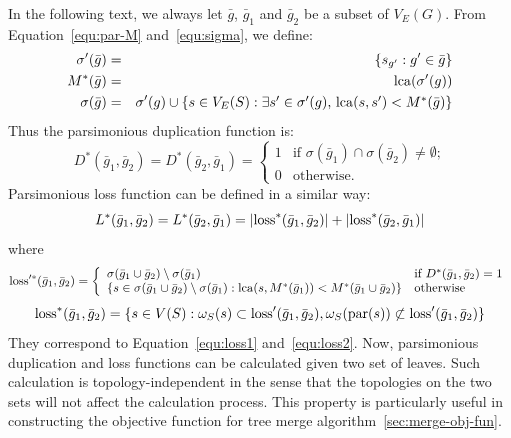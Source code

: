 In the following text, we always let $\bar{g}$, $\bar{g}_1$ and $\bar{g}_2$
be a subset of $V_E(G)$. From Equation~\ref{equ:par-M} and~\ref{equ:sigma}, we define:
\begin{eqnarray}
\sigma'(\bar{g}) &=& \{s_{g'}:g'\in \bar{g}\} \\
M^*(\bar{g}) &=& \mathrm{lca}(\sigma'(g)) \\
\sigma(\bar{g}) &=& \sigma'(g)\cup\left\{s\in V_E(S):\mbox{$\exists s'\in\sigma'(g)$, $\mathrm{lca}(s,s')<M^*(\bar{g})$}\right\}
\end{eqnarray}
Thus the parsimonious duplication function is:
\begin{equation}
D^*(\bar{g}_1,\bar{g}_2)=D^*(\bar{g}_2,\bar{g}_1)=\left\{\begin{array}{ll}
	1 & \mbox{if $\sigma(\bar{g}_1)\cap\sigma(\bar{g}_2)\not=\emptyset$;} \\
	0 & \mbox{otherwise.}\end{array}\right.
\end{equation}
Parsimonious loss function can be defined in a similar way:
\begin{equation}
L^*(\bar{g}_1,\bar{g}_2)=L^*(\bar{g}_2,\bar{g}_1)=|\mathrm{loss}^*(\bar{g}_1,\bar{g}_2)|+|\mathrm{loss}^*(\bar{g}_2,\bar{g}_1)|
\end{equation}
where
\begin{equation}
\mathrm{loss}'^*(\bar{g}_1,\bar{g}_2) = \left\{\begin{array}{ll}
	\sigma(\bar{g}_1\cup\bar{g}_2)\setminus\sigma(\bar{g}_1) & \mbox{if $D^*(\bar{g}_1,\bar{g}_2)=1$} \\
	\{s\in\sigma(\bar{g}_1\cup\bar{g}_2)\setminus\sigma(\bar{g}_1):\mathrm{lca}(s,M^*(\bar{g}_1))<M^*(\bar{g}_1\cup\bar{g}_2)\} & \mbox{otherwise}
\end{array}\right.
\end{equation}
\begin{equation}
\mathrm{loss}^*(\bar{g}_1,\bar{g}_2) = \{s\in V(S):\omega_S(s)\subset\mathrm{loss}'(\bar{g}_1,\bar{g}_2),\omega_S(\mathrm{par}(s))\not\subset\mathrm{loss}'(\bar{g}_1,\bar{g}_2)\}
\end{equation}
They correspond to Equation~\ref{equ:loss1} and~\ref{equ:loss2}.
Now, parsimonious duplication and loss functions can be calculated given two set of leaves.
Such calculation is topology-independent in the sense that the topologies on the two sets
will not affect the calculation process. This property is particularly useful
in constructing the objective function for tree merge algorithm~\ref{sec:merge-obj-fun}.

